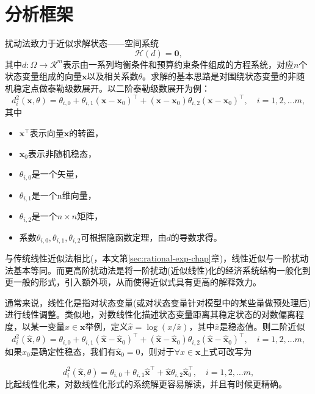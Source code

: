\section{分析框架}
\label{sec:pta-perturbation-framework}
扰动法致力于近似求解状态——空间系统
\begin{equation}
  \label{sec:pta-problem-h}
  \mathcal{H}(d) = \bm{0},
\end{equation}
其中$d:\Omega \rightarrow \mathcal{R}^{m}$表示由一系列均衡条件和预算约束条件组成的方程系统，对应$n$个状态变量组成的向量$\bm{x}$以及相关系数$\theta$。求解的基本思路是对围绕状态变量的非随机稳定点做泰勒级数展开。以二阶泰勒级数展开为例：
\begin{equation}
  \label{eq:ptb-tse-2nd-example}
  d_i^2(\bm{x},\theta) = \theta_{i,0} + \theta_{i,1} (\bm{x}-\bm{x}_0)^{\top} +  (\bm{x}-\bm{x}_0) \theta_{i,2} (\bm{x}-\bm{x}_0)^{\top}, \quad i=1,2,\ldots m,
\end{equation}
其中
\begin{itemize}
  \item $\bm{x}^{\top}$表示向量$\bm{x}$的转置，
  \item $\bm{x}_0$表示非随机稳态，
  \item $\theta_{i,0}$是一个矢量，
  \item $\theta_{i,1}$是一个n维向量，
  \item $\theta_{i,2}$是一个$n \times n$矩阵，
  \item 系数$\theta_{i,0}, \theta_{i,1}, \theta_{i,2}$可根据隐函数定理，由$d$的导数求得。
\end{itemize}

与传统线性近似法相比(\citep{King:1988bk,King:1988kf,King:2002ih}，本文第\ref{sec:rational-exp-chap}章)，线性近似与一阶扰动法基本等同。而更高阶扰动法是将一阶扰动(近似线性)化的经济系统结构一般化到更一般的形式，引入额外项，从而使得近似式具有更高的解释效力。
\begin{remark}[扰动法的线性化和对数线性化]
  \label{remark:loglinearization}
  通常来说，线性化是指对状态变量(或对状态变量针对模型中的某些量做预处理后)进行线性调整。类似地，对数线性化描述状态变量距离其稳定状态的对数偏离程度，以某一变量$x \in \bm{x}$举例，定义$\hat{x} = \log \left(x / \bar{x} \right)$，其中$\bar{x}$是稳态值。则二阶近似
  \begin{equation*}
    d_i^2(\hat{\bm{x}},\theta) = \theta_{i,0} + \theta_{i,1} (\hat{\bm{x}} - \hat{\bm{x}}_0)^{\top} +  (\hat{\bm{x}} - \hat{\bm{x}}_0) \theta_{i,2} (\hat{\bm{x}} - \hat{\bm{x}}_0)^{\top}, \quad i=1,2,\ldots m,
  \end{equation*}
  如果$x_0$是确定性稳态，我们有$\hat{\bm{x}}_0 = 0$，则对于$\forall x \in \bm{x}$上式可改写为

  \begin{equation*}
      d_i^2(\hat{\bm{x}},\theta) = \theta_{i,0} + \theta_{i,1} \hat{\bm{x}}^{\top} +  \hat{\bm{x}} \theta_{i,2} \hat{\bm{x}}_0^{\top}, \quad i=1,2,\ldots m,
  \end{equation*}
  比起线性化来，对数线性化形式的系统解更容易解读，并且有时候更精确。
\end{remark}

